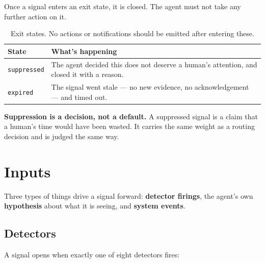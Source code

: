 \documentclass[11pt, a4paper]{article}
\begin{document}
Once a signal enters an exit state, it is closed. The agent must not take any further action on it.

\begin{table}[h]
\centering
\begin{tabular}{lp{10cm}}
\toprule
\textbf{State} & \textbf{What's happening} \\
\midrule
\texttt{suppressed} & The agent decided this does not deserve a human's attention, and closed it with a reason. \\
\texttt{expired} & The signal went stale --- no new evidence, no acknowledgement --- and timed out. \\
\bottomrule
\end{tabular}
\caption{Exit states. No actions or notifications should be emitted after entering these.}
\label{tab:terminal}
\end{table}

\textbf{Suppression is a decision, not a default.} A suppressed signal is a claim that a human's time would have been wasted. It carries the same weight as a routing decision and is judged the same way.

\section{Inputs}
\label{sec:inputs}

Three types of things drive a signal forward: \textbf{detector firings}, the agent's own \textbf{hypothesis} about what it is seeing, and \textbf{system events}.

\subsection{Detectors}

A signal opens when exactly one of eight detectors fires:
\end{document}
